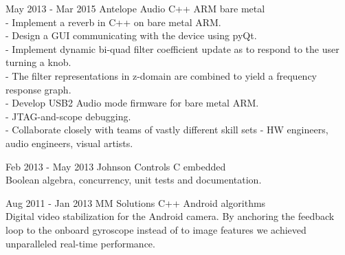 \documentclass{tccv}
\begin{document}
\begin{eventlist}
\item{May 2013 - Mar 2015}
     {Antelope Audio}
     {C++ ARM bare metal}  \\
- Implement a reverb in C++ on bare metal ARM.  \\
- Design a GUI communicating with the device using pyQt.  \\
- Implement dynamic bi-quad filter coefficient update as to respond to the user turning a knob.  \\
- The filter representations in z-domain are combined to yield a frequency response graph.  \\
- Develop USB2 Audio mode firmware for bare metal ARM.  \\
- JTAG-and-scope debugging.  \\
- Collaborate closely with teams of vastly different skill sets - HW engineers, audio engineers, visual artists.  \\

\pagebreak
\item{Feb 2013 - May 2013}
     {Johnson Controls}
     {C embedded} \\
Boolean algebra, concurrency, unit tests and documentation.  \\

\item{Aug 2011 - Jan 2013}
     {MM Solutions}
     {C++ Android algorithms} \\
Digital video stabilization for the Android camera.
By anchoring the feedback loop to the onboard gyroscope instead of to image features we achieved unparalleled real-time performance.
\end{eventlist}
\end{document}
